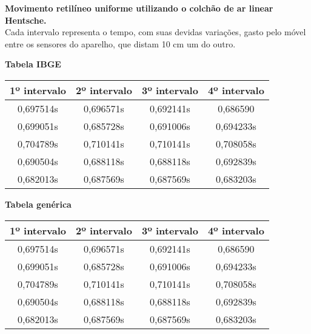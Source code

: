 \documentclass[		
oneside,		
a4paper,						
12pt,
brazil]{abntex2}
\begin{document}
\textbf{Movimento retilíneo uniforme utilizando o colchão de ar linear Hentsche.}\\

Cada intervalo representa o tempo, com suas devidas variações, gasto pelo móvel entre os sensores do aparelho, que distam 10 cm um do outro.\\

\begin{center}
 \textbf{Tabela IBGE}
\end{center}

\begin{table}[h]
	
{

\begin{tabular} {cccc}
	\toprule
	1º intervalo & 2º intervalo & 3º intervalo & 4º intervalo\\
	\midrule \midrule
	0,697514s & 0,696571s & 0,692141s & 0,686590\\
	\hline
	0,699051s & 0,685728s & 0,691006s & 0,694233s\\
	\hline
	0,704789s & 0,710141s & 0,710141s & 0,708058s\\
	\hline
	0,690504s & 0,688118s & 0,688118s & 0,692839s\\
	\hline
	0,682013s & 0,687569s & 0,687569s & 0,683203s\\
	\bottomrule
		
\end{tabular}
}
{ }
\end{table}

\begin{center}
	\textbf{Tabela genérica}
\end{center}


\begin{center}
\begin{tcolorbox}
	[title=Intervalos de tempo no espaço de 10cm,title filled,center title,hbox]
	
\begin{tabular}{c|c|c|c}

	
	1º intervalo & 2º intervalo & 3º intervalo & 4º intervalo\\
	\hline\hline
	0,697514s & 0,696571s & 0,692141s & 0,686590\\

	0,699051s & 0,685728s & 0,691006s & 0,694233s\\

	0,704789s & 0,710141s & 0,710141s & 0,708058s\\

	0,690504s & 0,688118s & 0,688118s & 0,692839s\\

	0,682013s & 0,687569s & 0,687569s & 0,683203s\\

\end{tabular}
\end{tcolorbox}
\end{center}
\end{document}
